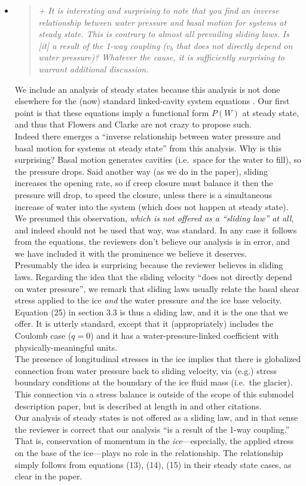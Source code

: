 \documentclass[11pt,reqno]{amsart}
\newcommand{\reply}[2]{
\medskip\medskip
\item  \begin{quote}
\emph{#1}
\end{quote}

\medskip
\noindent #2}
\begin{document}
\begin{itemize}
\reply{\label{inversepage} + It is interesting and surprising to note that you find an inverse relationship between water pressure and basal motion for systems at steady state. This is contrary to almost all prevailing sliding laws.  Is [it] a result of the 1-way coupling ($v_b$ that does not directly depend on water pressure)? Whatever the cause, it is sufficiently surprising to warrant additional discussion.}
{We include an analysis of steady states because this analysis is not done elsewhere for the (now) standard linked-cavity system equations \cite{Hewitt2011,Schoofetal2012}.  Our first point is that these equations imply a functional form $P(W)$ at steady state, and thus that Flowers and Clarke \cite{FlowersClarke2002} are not crazy to propose such.\\
\indent Indeed there emerges a ``inverse relationship between water pressure and basal motion for systems at steady state'' from this analysis.  Why is this surprising?  Basal motion generates cavities (i.e.~space for the water to fill), so the pressure drops.  Said another way (as we do in the paper), sliding increases the opening rate, so if creep closure must balance it then the pressure will drop, to speed the closure, unless there is a simultaneous increase of water into the system (which does not happen at steady state).  We presumed this observation, \emph{which is not offered as a ``sliding law'' at all}, and indeed should not be used that way, was standard.  In any case it follows from the equations, the reviewers don't believe our analysis is in error, and we have included it with the prominence we believe it deserves. \\
\indent Presumably the idea is surprising because the reviewer believes in sliding laws.  Regarding the idea that the sliding velocity ``does not directly
depend on water pressure'', we remark that sliding laws usually relate the basal shear stress applied to the ice \emph{and} the water pressure \emph{and} the ice base velocity.  Equation (25) in section 3.3 is thus a sliding law, and it is the one that we offer.  It is utterly standard, except that it (appropriately) includes the Coulomb case ($q=0$) and it has a water-pressure-linked coefficient with physically-meaningful units. \\
\indent  The presence of longitudinal stresses in the ice implies that there is globalized connection from water pressure back to sliding velocity, via (e.g.) stress boundary conditions at the boundary of the ice fluid mass (i.e.~the glacier).  This connection via a stress balance is outside of the scope of this submodel description paper, but is described at length in \cite{BBssasliding} and other citations.\\
\indent Our analysis of steady states is not offered as a sliding law, and in that sense the reviewer is correct that our analysis ``is a result of the 1-way coupling.'' That is, conservation of momentum in the \emph{ice}---especially, the applied stress  on the base of the ice---plays no role in the relationship.  The relationship simply follows from equations (13), (14), (15) in their steady state cases, as clear in the paper.}


\end{itemize}
\end{document}

